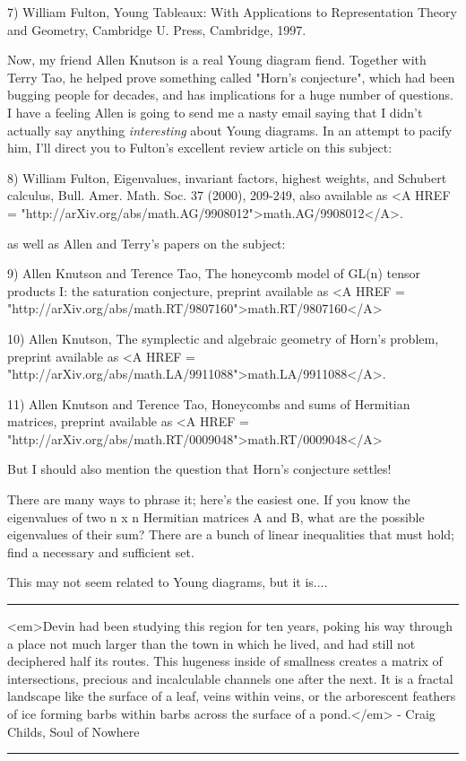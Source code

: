 7) William Fulton, Young Tableaux: With Applications to Representation
Theory and Geometry, Cambridge U. Press, Cambridge, 1997.

Now, my friend Allen Knutson is a real Young diagram fiend.  Together
with Terry Tao, he helped prove something called "Horn's conjecture",
which had been bugging people for decades, and has implications for a
huge number of questions.  I have a feeling Allen is going to send me a
nasty email saying that I didn't actually say anything \emph{interesting}
about Young diagrams.  In an attempt to pacify him, I'll direct you to
Fulton's excellent review article on this subject:

8) William Fulton, Eigenvalues, invariant factors, highest weights, and
Schubert calculus, Bull. Amer. Math. Soc. 37 (2000), 209-249, also
available as <A HREF =
"http://arXiv.org/abs/math.AG/9908012">math.AG/9908012</A>.

as well as Allen and Terry's papers on the subject:

9) Allen Knutson and Terence Tao, The honeycomb model of GL(n) tensor
products I: the saturation conjecture, preprint available as 
<A HREF = "http://arXiv.org/abs/math.RT/9807160">math.RT/9807160</A>

10) Allen Knutson, The symplectic and algebraic geometry of Horn's problem,
preprint available as
<A HREF = "http://arXiv.org/abs/math.LA/9911088">math.LA/9911088</A>.

11) Allen Knutson and Terence Tao, Honeycombs and sums of Hermitian
matrices, preprint available as <A HREF =
"http://arXiv.org/abs/math.RT/0009048">math.RT/0009048</A>

But I should also mention the question that Horn's conjecture settles!

There are many ways to phrase it; here's the easiest one.  If you
know the eigenvalues of two n x n Hermitian matrices A and B, what are
the possible eigenvalues of their sum?  There are a bunch of linear 
inequalities that must hold; find a necessary and sufficient set.

This may not seem related to Young diagrams, but it is....






 \par\noindent\rule{\textwidth}{0.4pt}
<em>Devin had been studying this region for ten years, poking his
way through a place not much larger than the town in which he
lived, and had still not deciphered half its routes.  This hugeness
inside of smallness creates a matrix of intersections, precious
and incalculable channels one after the next.  It is a fractal landscape
like the surface of a leaf, veins within veins, or the arborescent
feathers of ice forming barbs within barbs across the surface of a pond.</em> -
Craig Childs, Soul of Nowhere
\par\noindent\rule{\textwidth}{0.4pt}

